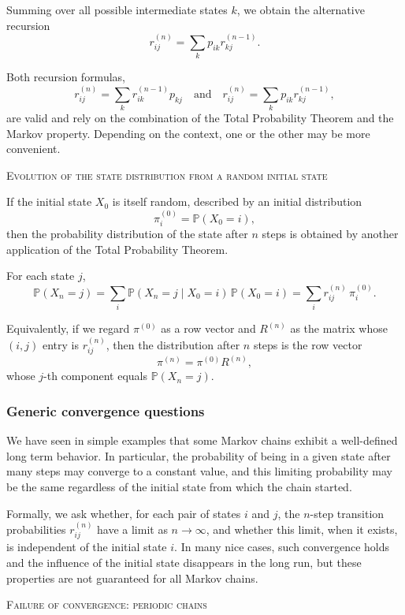 Summing over all possible intermediate states \(k\), we obtain the alternative recursion
\[
r_{ij}^{(n)}
=
\sum_{k} p_{ik} r_{kj}^{(n-1)}.
\]

Both recursion formulas,
\[
r_{ij}^{(n)}
=
\sum_{k} r_{ik}^{(n-1)} p_{kj}
\quad\text{and}\quad
r_{ij}^{(n)}
=
\sum_{k} p_{ik} r_{kj}^{(n-1)},
\]
are valid and rely on the combination of the Total Probability Theorem and the Markov property.
Depending on the context, one or the other may be more convenient.

\bigskip
\textsc{Evolution of the state distribution from a random initial state}

If the initial state \(X_0\) is itself random, described by an initial distribution
\[
\pi_i^{(0)} = \mathbb{P}(X_0 = i),
\]
then the probability distribution of the state after \(n\) steps is obtained by another application of the Total Probability Theorem.

For each state \(j\),
\[
\mathbb{P}(X_n = j)
=
\sum_{i} \mathbb{P}(X_n = j \mid X_0 = i) \,\mathbb{P}(X_0 = i)
=
\sum_{i} r_{ij}^{(n)} \,\pi_i^{(0)}.
\]

Equivalently, if we regard \(\pi^{(0)}\) as a row vector and \(R^{(n)}\) as the matrix whose \((i,j)\) entry is \(r_{ij}^{(n)}\), then the distribution after \(n\) steps is the row vector
\[
\pi^{(n)}
=
\pi^{(0)} R^{(n)},
\]
whose \(j\)-th component equals \(\mathbb{P}(X_n = j)\).


\subsubsection{Generic convergence questions}

We have seen in simple examples that some Markov chains exhibit a well-defined long term behavior.
In particular, the probability of being in a given state after many steps may converge to a constant value, and this limiting probability may be the same regardless of the initial state from which the chain started.

Formally, we ask whether, for each pair of states \(i\) and \(j\), the \(n\)-step transition probabilities \(r_{ij}^{(n)}\) have a limit as \(n \to \infty\), and whether this limit, when it exists, is independent of the initial state \(i\).
In many nice cases, such convergence holds and the influence of the initial state disappears in the long run, but these properties are not guaranteed for all Markov chains.

\bigskip
\textsc{Failure of convergence: periodic chains}

